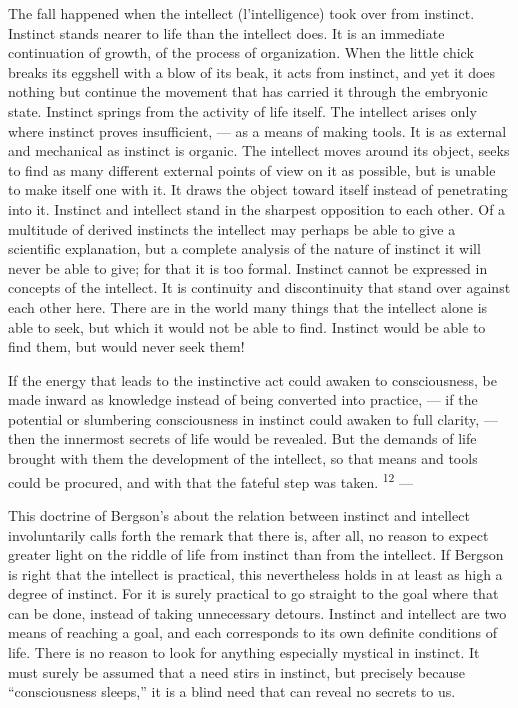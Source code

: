 \documentclass[12pt,a4paper,openany]{book}
\newcommand{\opage}[1]{\marginnote{\footnotesize\textit{[#1]}}}
\newcommand{\nm}[1]{\unskip\textsuperscript{#1}}
\begin{document}
The fall happened when the intellect (l'intelligence) took over from instinct. Instinct stands nearer to life than the intellect does. It is an immediate continuation of growth, of the process of organization. When the little chick breaks its eggshell with a blow of its beak, it acts from instinct, and yet it does nothing but continue the movement that has carried it through the embryonic state. Instinct springs from the activity of life itself. The intellect arises only where instinct proves insufficient, --- as a means of making tools. It is as external and mechanical as instinct is organic. The intellect moves around its object, seeks to find
\opage{18}as many different external points of view on it as possible, but is unable to make itself one with it. It draws the object toward itself instead of penetrating into it. Instinct and intellect stand in the sharpest opposition to each other. Of a multitude of derived instincts the intellect may perhaps be able to give a scientific explanation, but a complete analysis of the nature of instinct it will never be able to give; for that it is too formal. Instinct cannot be expressed in concepts of the intellect. It is continuity and discontinuity that stand over against each other here. There are in the world many things that the intellect alone is able to seek, but which it would not be able to find. Instinct would be able to find them, but would never seek them!

If the energy that leads to the instinctive act could awaken to consciousness, be made inward as knowledge instead of being converted into practice, --- if the potential or slumbering consciousness in instinct could awaken to full clarity, --- then the innermost secrets of life would be revealed. But the demands of life brought with them the development of the intellect, so that means and tools could be procured, and with that the fateful step was taken. \nm{12} ---

This doctrine of Bergson's about the relation between instinct and intellect involuntarily calls forth the remark that there is, after all, no reason to expect greater light on the riddle of life from instinct than from the intellect. If Bergson is right that the intellect is practical, this nevertheless holds in at least as high a degree of instinct. For it is surely practical to go straight to the goal where that can be done, instead of taking unnecessary detours. Instinct and intellect are two means of reaching a goal, and each corresponds to its own definite conditions of life. There is no reason to look for anything especially mystical in instinct. It must surely be assumed that a need stirs in instinct, but precisely because ``consciousness sleeps,'' it is a blind need that can reveal no secrets to us.
\end{document}
